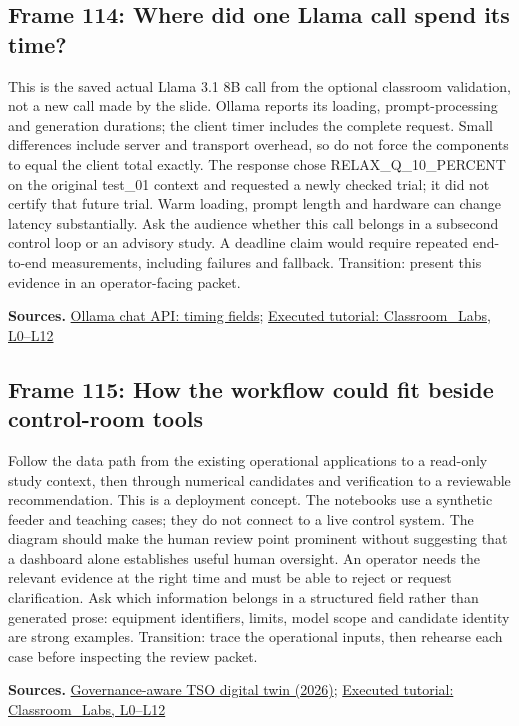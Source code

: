 \documentclass[11pt]{article}
\begin{document}
\subsection*{Frame 114: Where did one Llama call spend its time?}
This is the saved actual Llama 3.1 8B call from the optional classroom validation, not a new call made by the slide. Ollama reports its loading, prompt-processing and generation durations; the client timer includes the complete request. Small differences include server and transport overhead, so do not force the components to equal the client total exactly. The response chose RELAX\_Q\_10\_PERCENT on the original test\_01 context and requested a newly checked trial; it did not certify that future trial. Warm loading, prompt length and hardware can change latency substantially. Ask the audience whether this call belongs in a subsecond control loop or an advisory study. A deadline claim would require repeated end-to-end measurements, including failures and fallback. Transition: present this evidence in an operator-facing packet.\par
\par\nopagebreak\begin{minipage}{\linewidth}{\footnotesize\color{slate}\textbf{Sources.} \href{https://docs.ollama.com/api/chat}{Ollama chat API: timing fields}; \href{../Classroom_Labs.html}{Executed tutorial: Classroom\_Labs, L0--L12}\par}\end{minipage}\par\medskip
\subsection*{Frame 115: How the workflow could fit beside control-room tools}
Follow the data path from the existing operational applications to a read-only study context, then through numerical candidates and verification to a reviewable recommendation. This is a deployment concept. The notebooks use a synthetic feeder and teaching cases; they do not connect to a live control system. The diagram should make the human review point prominent without suggesting that a dashboard alone establishes useful human oversight. An operator needs the relevant evidence at the right time and must be able to reject or request clarification. Ask which information belongs in a structured field rather than generated prose: equipment identifiers, limits, model scope and candidate identity are strong examples. Transition: trace the operational inputs, then rehearse each case before inspecting the review packet.\par
\par\nopagebreak\begin{minipage}{\linewidth}{\footnotesize\color{slate}\textbf{Sources.} \href{https://arxiv.org/html/2609.22476v1}{Governance-aware TSO digital twin (2026)}; \href{../Classroom_Labs.html}{Executed tutorial: Classroom\_Labs, L0--L12}\par}\end{minipage}\par\medskip
\end{document}
